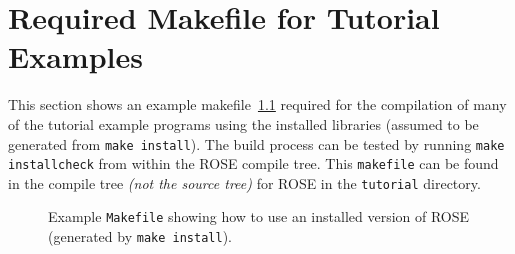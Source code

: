 
\chapter{Required Makefile for Tutorial Examples}
\label{TutorialMakefiles}


    This section shows an example makefile~\ref{Tutorial:exampleMakefile} 
required for the compilation of many of the tutorial example programs 
using the installed libraries (assumed to be generated from {\tt make install}).
The build process can be tested by running {\tt make installcheck} from within 
the ROSE compile tree.  This {\tt makefile} can be found in the compile tree
{\em (not the source tree)} for ROSE in the {\tt tutorial} directory.

\begin{figure}[!h]
{\indent
{\mySmallFontSize

\begin{latexonly}
%  
%  
\end{latexonly}

\begin{htmlonly}
   
\end{htmlonly}

}
}
\caption{Example {\tt Makefile} showing how to use an installed version of ROSE (generated by {\tt make install}).}
\label{Tutorial:exampleMakefile}
\end{figure}

